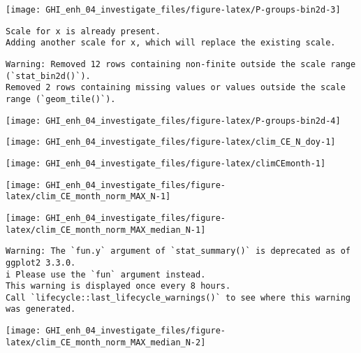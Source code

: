 \documentclass[
  10pt,
  a4paper,oneside]{article}
\begin{document}
\begin{center}\texttt{[image: GHI\_enh\_04\_investigate\_files/figure-latex/P-groups-bin2d-3]} \end{center}

\begin{verbatim}
Scale for x is already present.
Adding another scale for x, which will replace the existing scale.
\end{verbatim}

\begin{verbatim}
Warning: Removed 12 rows containing non-finite outside the scale range (`stat_bin2d()`).
Removed 2 rows containing missing values or values outside the scale range (`geom_tile()`).
\end{verbatim}

\begin{center}\texttt{[image: GHI\_enh\_04\_investigate\_files/figure-latex/P-groups-bin2d-4]} \end{center}

\begin{center}\texttt{[image: GHI\_enh\_04\_investigate\_files/figure-latex/clim\_CE\_N\_doy-1]} \end{center}

\begin{center}\texttt{[image: GHI\_enh\_04\_investigate\_files/figure-latex/climCEmonth-1]} \end{center}

\begin{center}\texttt{[image: GHI\_enh\_04\_investigate\_files/figure-latex/clim\_CE\_month\_norm\_MAX\_N-1]} \end{center}

\begin{center}\texttt{[image: GHI\_enh\_04\_investigate\_files/figure-latex/clim\_CE\_month\_norm\_MAX\_median\_N-1]} \end{center}

\begin{verbatim}
Warning: The `fun.y` argument of `stat_summary()` is deprecated as of ggplot2 3.3.0.
i Please use the `fun` argument instead.
This warning is displayed once every 8 hours.
Call `lifecycle::last_lifecycle_warnings()` to see where this warning was generated.
\end{verbatim}

\begin{center}\texttt{[image: GHI\_enh\_04\_investigate\_files/figure-latex/clim\_CE\_month\_norm\_MAX\_median\_N-2]} \end{center}
\end{document}
